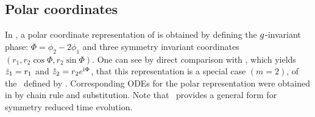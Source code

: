 \subsection{Polar coordinates}
\label{s-polar}

In , a polar coordinate representation of 
is obtained by defining the $g$-invariant phase: $\Phi = \phi_2 - 2 \phi_1$
and three symmetry invariant coordinates $(r_1, r_2 \cos \Phi, r_2 \sin \Phi)$.
One can see by direct comparison with , which
yields $\hat{z}_1 = r_1$ and $\hat{z}_2 = r_2 e^{\mathrm{i} \Phi}$, that this
representation is a special case $(m=2)$, of the \slice\ defined by
. Corresponding ODEs for the polar representation
were obtained in  by  chain rule and substitution. Note
that \mslices\ provides a general form  for symmetry
reduced time evolution.
